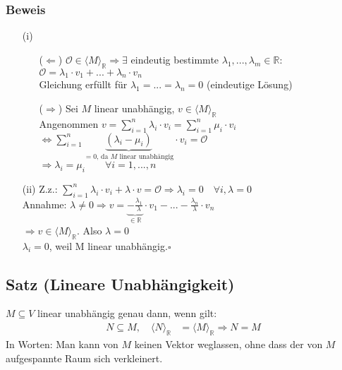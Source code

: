 \documentclass[a4paper, 12pt,titlepage, pdf, headsepline]{scrartcl}
\newcommand{\R}{\mathds{R}}
\newcommand{\vecspace}[2]{\langle#1\rangle_{#2}}
\newcommand{\vecspaceR}[1]{\vecspace{#1}{\R}}
\renewcommand{\>}{\rightarrow}
\renewcommand{\*}{\cdot}
\begin{document}
\subsubsection*{Beweis}
\begin{itemize}
	\item[(i)] 
	      \begin{itemize}
	      	\item[($\Leftarrow$)] $ \mathcal{O} \in \vecspaceR{M} \Rightarrow \exists$ eindeutig bestimmte $\lambda_1, ... , \lambda_m \in \R:$\\
	      	      \noindent\hspace*{23mm}$\mathcal{O} = \lambda_1 \cdot v_1 + ... + \lambda_n \cdot v_n$ \\
	      	      Gleichung erfüllt für $\lambda_1 = ... = \lambda_n = 0$ (eindeutige Lösung)
	      	\item[($\Rightarrow$)] Sei $M$ linear unabhängig, $v \in \vecspaceR{M}$\\
	      	      Angenommen $v = \sum_{i = 1}^{n} \lambda_i \cdot v_i = \sum_{i = 1}^{n} \mu_i \cdot v_i $\\
	      	      \noindent\hspace*{25mm}$\Leftrightarrow  \sum_{i=1}^{n} \underbrace{(\lambda_i - \mu_i)}_{=0\textrm{, da }M\textrm{ linear unabhängig}} \cdot v_i = \mathcal{O}$\\
	      	      \noindent\hspace*{25mm}$\Rightarrow \lambda_i = \mu_i \qquad \forall i = 1,...,n$
	      \end{itemize}
	\item[(ii)] Z.z.: $\sum_{i=1}^{n} \lambda_i \cdot v_i + \lambda \cdot v = \mathcal{O} \Rightarrow \lambda_i = 0 \quad\forall i, \lambda = 0$ \\
	      Annahme: $\lambda \neq 0 \Rightarrow v = \underbrace{-\frac{\lambda_1}{\lambda}}_{\in\R} \cdot v_1 - ... - \frac{\lambda_n}{\lambda} \cdot v_n $\\
	      \noindent\hspace*{29mm}$\Rightarrow v \in \vecspaceR{M}$\Lightning. Also $\lambda = 0$ \\
	      $\lambda_i = 0$, weil M linear unabhängig.\hfill$\square$
\end{itemize}
\subsection{Satz (Lineare Unabhängigkeit)}
\label{1.17}
$M \subseteq V$ linear unabhängig genau dann, wenn gilt:
\begin{align*}
	N \subseteq M,\quad \vecspaceR{N} & = \vecspaceR{M} \Rightarrow N = M 
\end{align*}
In Worten: Man kann von $M$ keinen Vektor weglassen, ohne dass der von $M$ aufgespannte Raum sich verkleinert.  \\
\end{document}
